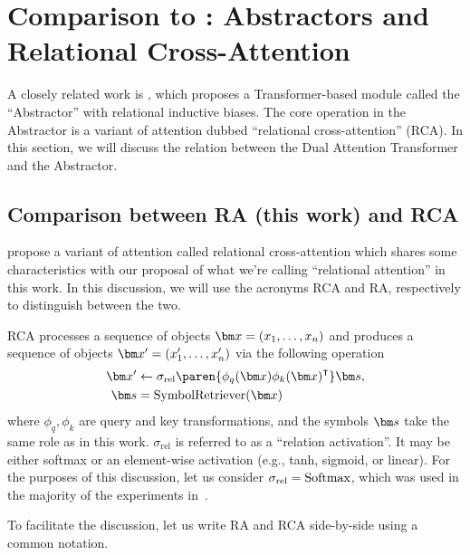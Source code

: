 \section{Comparison to \texorpdfstring{\citet{altabaa2024abstractors}}{Altabaa et al. (2024)}: Abstractors and Relational Cross-Attention}\label{sec:appdx_abstrator}

A closely related work is \citet{altabaa2024abstractors}, which proposes a Transformer-based module called the ``Abstractor'' with relational inductive biases. The core operation in the Abstractor is a variant of attention dubbed ``relational cross-attention'' (RCA). In this section, we will discuss the relation between the Dual Attention Transformer and the Abstractor.

\subsection{Comparison between RA (this work) and RCA \texorpdfstring{\citep{altabaa2024abstractors}}{(Altabaa et al., 2024)}}

\citet{altabaa2024abstractors} propose a variant of attention called relational cross-attention which shares some characteristics with our proposal of what we're calling ``relational attention'' in this work. In this discussion, we will use the acronyms RCA and RA, respectively to distinguish between the two.

RCA processes a sequence of objects $\x = (x_1, \ldots, x_n)$ and produces a sequence of objects $\x' = (x_1', \ldots, x_n')$ via the following operation
\begin{align*}
    \x' &\gets \sigma_{\mathrm{rel}}\paren{\phi_q(\x) {\phi_k(\x)}^\intercal} \s, \\
    \s &= \SymbolRetriever(\x)
\end{align*}
where $\phi_q, \phi_k$ are query and key transformations, and the symbols $\s$ take the same role as in this work. $\sigma_{\mathrm{rel}}$ is referred to as a ``relation activation''. It may be either softmax or an element-wise activation (e.g., tanh, sigmoid, or linear). For the purposes of this discussion, let us consider $\sigma_{\mathrm{rel}} = \mathrm{Softmax}$, which was used in the majority of the experiments in~\citep{altabaa2024abstractors}.

To facilitate the discussion, let us write RA and RCA side-by-side using a common notation.

